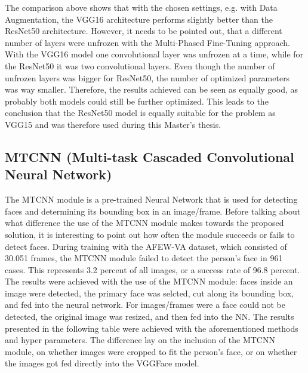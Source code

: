 The comparison above shows that with the chosen settings, e.g. with Data Augmentation, the VGG16 architecture performs slightly better than the ResNet50 architecture. However, it needs to be pointed out, that a different number of layers were unfrozen with the Multi-Phased Fine-Tuning approach. With the VGG16 model one convolutional layer was unfrozen at a time, while for the ResNet50 it was two convolutional layers. Even though the number of unfrozen layers was bigger for ResNet50, the number of optimized parameters was way smaller. Therefore, the results achieved can be seen as equally good, as probably both models could still be further optimized. This leads to the conclusion that the ResNet50 model is equally suitable for the problem as VGG15 and was therefore used during this Master's thesis.

\subsection{MTCNN (Multi-task Cascaded Convolutional Neural Network)}
The MTCNN module is a pre-trained Neural Network that is used for detecting faces and determining its bounding box in an image/frame. Before talking about what difference the use of the MTCNN module makes towards the proposed solution, it is interesting to point out how often the module succeeds or fails to detect faces.
\newline\newline
During training with the AFEW-VA dataset, which consisted of 30.051 frames, the MTCNN module failed to detect the person's face in 961 cases. This represents 3.2 percent of all images, or a success rate of 96.8 percent.
\newline\newline
The results were achieved with the use of the MTCNN module: faces inside an image were detected, the primary face was selcted, cut along its bounding box, and fed into the neural network. For images/frames were a face could not be detected, the original image was resized, and then fed into the NN.
\newline\newline
The results presented in the following table were achieved with the aforementioned methods and hyper parameters. The difference lay on the inclusion of the MTCNN module, on whether images were cropped to fit the person's face, or on whether the images got fed directly into the VGGFace model.

